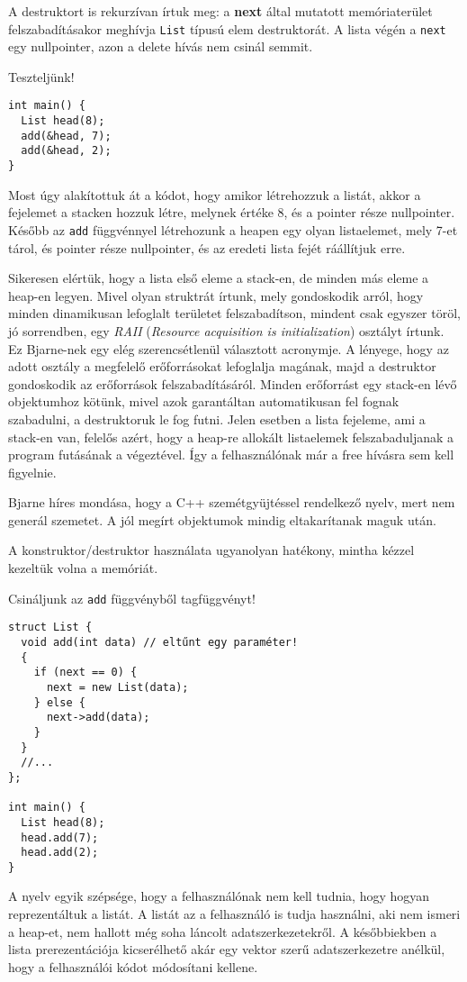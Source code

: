 \documentclass[../cpp_book/cpp_book.tex]{subfiles}
\begin{document}
	\medskip
	A destruktort is rekurzívan írtuk meg: a \textbf{next} által mutatott memóriaterület felszabadításakor meghívja \texttt{List} típusú elem destruktorát. A lista végén a \texttt{next} egy nullpointer, azon a delete hívás nem csinál semmit.
	
	\medskip
	Teszteljünk!
	\begin{lstlisting}
int main() {
  List head(8);
  add(&head, 7);
  add(&head, 2);
}
	\end{lstlisting}
	Most úgy alakítottuk át a kódot, hogy amikor létrehozzuk a listát, akkor a fejelemet a stacken hozzuk létre, melynek értéke 8, és a pointer része nullpointer. Később az \texttt{add} függvénnyel létrehozunk a heapen egy olyan listaelemet, mely 7-et tárol, és pointer része nullpointer, és az eredeti lista fejét ráállítjuk erre.
	\medskip
	
	Sikeresen elértük, hogy a lista első eleme a stack-en, de minden más eleme a heap-en legyen. Mivel olyan struktrát írtunk, mely gondoskodik arról, hogy minden dinamikusan lefoglalt területet felszabadítson, mindent csak egyszer töröl, jó sorrendben, egy  \textit{RAII} (\textit{Resource acquisition is initialization}) osztályt írtunk. Ez Bjarne-nek egy elég szerencsétlenül választott acronymje. A lényege, hogy az adott osztály a megfelelő erőforrásokat lefoglalja magának, majd a destruktor gondoskodik az erőforrások felszabadításáról. Minden erőforrást egy stack-en lévő objektumhoz kötünk, mivel azok garantáltan automatikusan fel fognak szabadulni, a destruktoruk le fog futni. Jelen esetben a lista fejeleme, ami a stack-en van, felelős azért, hogy a heap-re allokált listaelemek felszabaduljanak a program futásának a végeztével. Így a felhasználónak már a free hívásra sem kell figyelnie.
	
	Bjarne híres mondása, hogy a C++ szemétgyüjtéssel rendelkező nyelv, mert nem generál szemetet. A jól megírt objektumok mindig eltakarítanak maguk után. 
	\medskip
	
	A konstruktor/destruktor használata ugyanolyan hatékony, mintha kézzel kezeltük volna a memóriát.
	
	\medskip
	Csináljunk az \texttt{add} függvényből tagfüggvényt!
	\begin{lstlisting}
struct List {
  void add(int data) // eltűnt egy paraméter!
  {
    if (next == 0) {
      next = new List(data);
    } else {
      next->add(data);
    }
  }
  //...
};

int main() {
  List head(8);
  head.add(7);
  head.add(2);
}
	\end{lstlisting}
	A nyelv egyik szépsége, hogy a felhasználónak nem kell tudnia, hogy hogyan reprezentáltuk a listát. A listát az a felhasználó is tudja használni, aki nem ismeri a heap-et, nem hallott még soha láncolt adatszerkezetekről. A későbbiekben a lista prerezentációja kicserélhető akár egy vektor szerű adatszerkezetre anélkül, hogy a felhasználói kódot módosítani kellene.
	\medskip
	
\end{document}
